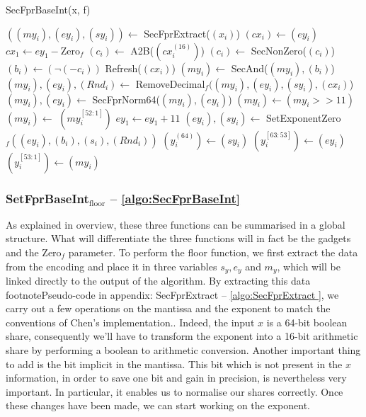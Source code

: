 \documentclass[runningheads]{llncs}
\begin{document}
    \begin{algorithm}
        \caption{SecFprBaseInt(x, f)}
        \label{algo:SecFprBaseInt}
        $((my_i), (ey_i), (sy_i)) \leftarrow$ SecFprExtract($(x_i)$)\;%
        $(cx_i) \leftarrow (ey_i)$\;
        $cx_1 \leftarrow ey_1 - \text{Zero}_f$\;%
        $(c_i) \leftarrow$ A2B($(cx_i^{(16)})$)\; 
        $(c_i) \leftarrow$ SecNonZero($(c_i)$)
        $(b_i) \leftarrow (\neg(-c_i))$\;
        Refresh($(cx_i)$)\;
        $(my_i) \leftarrow$ SecAnd($(my_i), (b_i)$)\;%
        $(my_i), (ey_i), (Rnd_i) \leftarrow$ RemoveDecimal$_f((my_i), (ey_i), (sy_i), (cx_i)$)\;%
        $(my_i), (ey_i) \leftarrow$ SecFprNorm64($(my_i),(ey_i)$)\;
        $(my_i) \leftarrow (my_i >> 11)$\;
        $(my_i) \leftarrow$ $(my_i^{[52:1]}) $\;
        $ey_1 \leftarrow ey_1 + 11$\;
        $(ey_i), (sy_i) \leftarrow$ SetExponentZero$_f((ey_i), (b_i), (s_i), (Rnd_i))$\;%
        $(y_i^{(64)}) \leftarrow (sy_i) $\;
        $(y_i^{[63:53]}) \leftarrow (ey_i) $\;
        $(y_i^{[53:1]}) \leftarrow (my_i) $\;
      \;
      \end{algorithm}
      \subsubsection{SetFprBaseInt$_\text{floor}$ -- \autoref{algo:SecFprBaseInt}}
      As explained in overview, these three functions can be summarised in a global structure. 
      What will differentiate the three functions will in fact be the gadgets and the Zero$_f$ parameter.
      To perform the floor function, we first extract the data from the encoding and place it in three variables $s_y, e_y$ and $m_y$, which will be linked directly to the output of the algorithm. 
      By extracting this data footnote{Pseudo-code in appendix: SecFprExtract -- \autoref{algo:SecFprExtract }}, we carry out a few operations on the mantissa and the exponent to match the conventions of Chen's implementation..
        Indeed, the input $x$ is a 64-bit boolean share, consequently we'll have to transform the exponent into a 16-bit arithmetic share by performing a boolean to arithmetic conversion.
        Another important thing to add is the bit implicit in the mantissa. 
        This bit which is not present in the $x$ information, in order to save one bit and gain in precision, is nevertheless very important.
        In particular, it enables us to normalise our shares correctly.
        Once these changes have been made, we can start working on the exponent.
\end{document}
